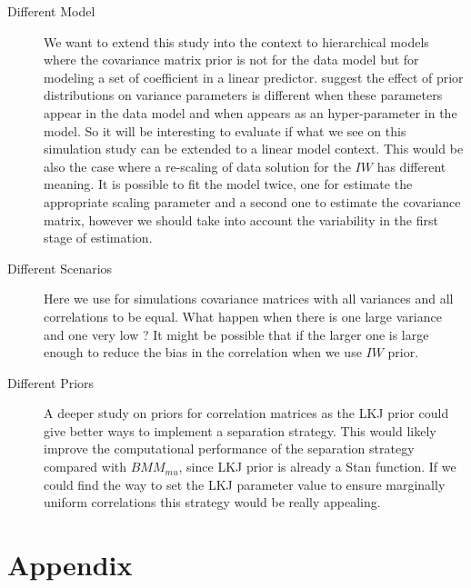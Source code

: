 \documentclass{article}
\begin{document}
\begin{description} 
\item[Different Model] We want to extend this study into the context to hierarchical models where the covariance matrix prior is not for the data model but for modeling a set of coefficient in a linear predictor. \cite{gelman2006prior} suggest the effect of prior distributions on variance parameters is different when these parameters appear in the data model and when appears as an hyper-parameter in the model. So it will be interesting to evaluate if what we see on this simulation study can be extended to a linear model context. This would be also the case where a re-scaling of data solution for the $IW$ has different meaning. It is possible to fit the model twice, one for estimate the appropriate scaling parameter and a second one to estimate the covariance matrix, however we should take into account the variability in the first stage of estimation. 

\item[Different Scenarios]  Here we use for simulations covariance matrices with all variances and all correlations to be equal. What happen when there is one large variance and one very low ? It might be possible that if the larger one is large enough to reduce the bias in the correlation when we use $IW$ prior. 

\item[Different Priors]A deeper study on priors for correlation matrices as the LKJ prior could give better ways to implement a separation strategy. This would likely improve the computational performance of the separation strategy compared with $BMM_{mu}$, since LKJ prior is already a Stan function. If we could find the way to set the LKJ parameter value to ensure marginally uniform correlations this strategy would be really appealing. 
\end{description}


      
      

\appendix
\section{Appendix}
\end{document}
